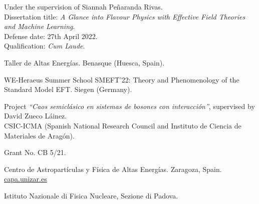 \documentclass{cvf}
\begin{document}
Under the supervision of Siannah Peñaranda Rivas.\\
Dissertation title: \textit{A Glance into Flavour Physics with Effective Field Theories and Machine Learning}.\\
Defense date: 27th April 2022.\\
Qualification: \textit{Cum Laude}.

Taller de Altas Energías. Benasque (Huesca, Spain).

WE-Heraeus Summer School SMEFT'22: Theory and Phenomenology of the Standard Model EFT. Siegen (Germany).




Project \textit{``Caos semiclásico en sistemas de bosones con interacción''}, supervised by David Zueco Láinez.\\
CSIC-ICMA (Spanish National Research Council and Instituto de Ciencia de Materiales de Aragón).


Grant No. CB 5/21.


Centro de Astropartículas y Física de Altas Energías. Zaragoza, Spain.\\
\url{capa.unizar.es}

Istituto Nazionale di Fisica Nucleare, Sezione di Padova.



\end{document}
